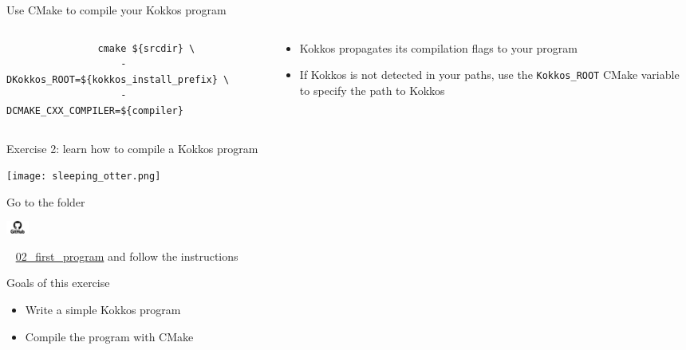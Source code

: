 \documentclass[aspectratio=169]{beamer}
\newcommand{\githublink}[2][2em]{%
    \hspace{-0.25em}%
    \parbox[c][#1][c]{#1}{%
        \includegraphics[width=#1]{GitHub-logo.png}%
    }%
    \hspace{-0.25em}%
    ~%
    #2%
}
\begin{document}

\begin{frame}[fragile]{Use CMake to compile your Kokkos program}
    \begin{columns}
        \begin{column}{0.6\linewidth}
            \begin{verbatim}
                cmake ${srcdir} \
                    -DKokkos_ROOT=${kokkos_install_prefix} \
                    -DCMAKE_CXX_COMPILER=${compiler}
            \end{verbatim}
        \end{column}
        \begin{column}{0.4\linewidth}
            \begin{itemize}
                \item Kokkos propagates its compilation flags to your program
                \item If Kokkos is not detected in your paths, use the \texttt{Kokkos\_ROOT} CMake variable to specify the path to Kokkos
            \end{itemize}
        \end{column}
    \end{columns}
\end{frame}


\begin{frame}[fragile]{Exercise 2: learn how to compile a Kokkos program}
    \begin{center}
        \texttt{[image: sleeping\_otter.png]}
    \end{center}

    Go to the folder \githublink{\href{https://github.com/CExA-project/cexa-kokkos-tutorials/tree/main/exercises/02_first_program}{02\_first\_program}} and follow the instructions

    \begin{block}{Goals of this exercise}
        \begin{itemize}
            \item Write a simple Kokkos program
            \item Compile the program with CMake
        \end{itemize}
    \end{block}
\end{frame}
\end{document}
